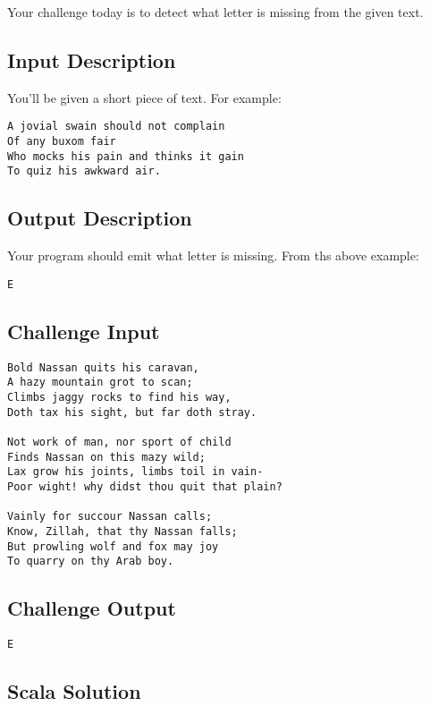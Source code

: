 Your challenge today is to detect what letter is missing from the given
text.

\subsection{Input Description}\label{input-description-23}

You'll be given a short piece of text. For example:

\begin{verbatim}
A jovial swain should not complain
Of any buxom fair
Who mocks his pain and thinks it gain
To quiz his awkward air.
\end{verbatim}

\subsection{Output Description}\label{output-description-24}

Your program should emit what letter is missing. From ths above example:

\begin{verbatim}
E
\end{verbatim}

\subsection{Challenge Input}\label{challenge-input-25}

\begin{verbatim}
Bold Nassan quits his caravan,
A hazy mountain grot to scan;
Climbs jaggy rocks to find his way,
Doth tax his sight, but far doth stray.

Not work of man, nor sport of child
Finds Nassan on this mazy wild;
Lax grow his joints, limbs toil in vain-
Poor wight! why didst thou quit that plain?

Vainly for succour Nassan calls;
Know, Zillah, that thy Nassan falls;
But prowling wolf and fox may joy
To quarry on thy Arab boy.
\end{verbatim}

\subsection{Challenge Output}\label{challenge-output-22}

\begin{verbatim}
E
\end{verbatim}

\subsection{Scala Solution}\label{scala-solution-18}

